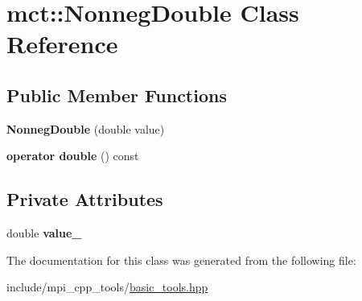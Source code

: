 \hypertarget{classmct_1_1NonnegDouble}{}\section{mct\+:\+:Nonneg\+Double Class Reference}
\label{classmct_1_1NonnegDouble}
\subsection*{Public Member Functions}
\begin{DoxyCompactItemize}
\item 
{\bfseries Nonneg\+Double} (double value)\hypertarget{classmct_1_1NonnegDouble_a416aa156d31270f95b569b2e00cafa06}{}\label{classmct_1_1NonnegDouble_a416aa156d31270f95b569b2e00cafa06}

\item 
{\bfseries operator double} () const \hypertarget{classmct_1_1NonnegDouble_aabb3515195942147a8cd5e81a34331ca}{}\label{classmct_1_1NonnegDouble_aabb3515195942147a8cd5e81a34331ca}

\end{DoxyCompactItemize}
\subsection*{Private Attributes}
\begin{DoxyCompactItemize}
\item 
double {\bfseries value\+\_\+}\hypertarget{classmct_1_1NonnegDouble_a5129a6c7ffbd14b989523a210e8180e4}{}\label{classmct_1_1NonnegDouble_a5129a6c7ffbd14b989523a210e8180e4}

\end{DoxyCompactItemize}


The documentation for this class was generated from the following file\+:\begin{DoxyCompactItemize}
\item 
include/mpi\+\_\+cpp\+\_\+tools/\hyperlink{basic__tools_8hpp}{basic\+\_\+tools.\+hpp}\end{DoxyCompactItemize}
